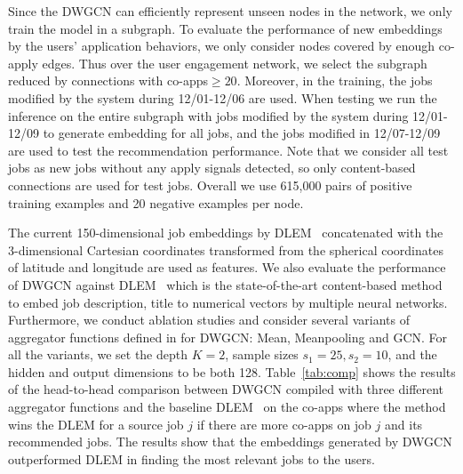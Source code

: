 \documentclass[manuscript,screen,review]{acmart}
\begin{document}
Since the DWGCN can efficiently represent unseen nodes in the network, we only train the model in a subgraph. To evaluate the performance of new embeddings by the users' application behaviors, we only consider nodes covered by enough co-apply edges. Thus    
over the user engagement network, we select the subgraph reduced by connections with co-apps$\geq20$.
Moreover, in the training, the jobs modified by the system during 12/01-12/06 are used. When testing we run the inference on the entire subgraph with jobs modified by the system during 12/01-12/09 to generate embedding for all jobs, and the jobs modified in 12/07-12/09 are used to test the recommendation performance. Note that we consider all test jobs as new jobs without any apply signals detected, so only content-based connections are used for test jobs.
Overall we use 615,000 pairs of positive training examples and 20 negative examples per node. 

The current 150-dimensional job embeddings by DLEM~\cite{zhao:2021embedding} concatenated with the 3-dimensional Cartesian coordinates transformed from the spherical coordinates of latitude and longitude are used as features. We also evaluate the performance of DWGCN against DLEM~\cite{zhao:2021embedding}  which is the  state-of-the-art content-based method to embed job description, title to numerical vectors by multiple neural networks. Furthermore, we conduct ablation studies and consider several variants of aggregator functions defined in \cite{hamilton2017inductive} for DWGCN: Mean, Meanpooling and GCN. For all the variants, we set the depth $K=2$, sample sizes $s_1=25,s_2=10$, and the hidden and output dimensions to be both 128.
Table~\ref{tab:comp} shows the results of the head-to-head comparison between DWGCN compiled with three different aggregator functions and the baseline DLEM~\cite{zhao:2021embedding} on the co-apps where the method wins the DLEM for a source job $j$ if there are more co-apps on job $j$ and its recommended jobs. The results show that the embeddings generated by DWGCN outperformed DLEM in finding the most relevant jobs to the users. 
\end{document}
